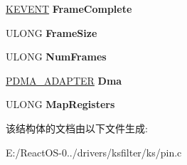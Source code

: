 \begin{DoxyCompactItemize}
\item 
\mbox{\label{struct_i_ks_pin_impl_ac589f8b5a203ed1f9e3703fd609e3782}} 
\hyperlink{struct___k_e_v_e_n_t}{K\+E\+V\+E\+NT} {\bfseries Frame\+Complete}
\item 
\mbox{\label{struct_i_ks_pin_impl_a5ede6905df58a6b254bfe28c06d3641c}} 
U\+L\+O\+NG {\bfseries Frame\+Size}
\item 
\mbox{\label{struct_i_ks_pin_impl_a0c4322e0972d47d3d9b164854a489a89}} 
U\+L\+O\+NG {\bfseries Num\+Frames}
\item 
\mbox{\label{struct_i_ks_pin_impl_aa8d24b67ebc23aea326ecc0eef456653}} 
\hyperlink{struct___d_m_a___a_d_a_p_t_e_r}{P\+D\+M\+A\+\_\+\+A\+D\+A\+P\+T\+ER} {\bfseries Dma}
\item 
\mbox{\label{struct_i_ks_pin_impl_a45d65baa6cb076d8a39e15be3f153b0a}} 
U\+L\+O\+NG {\bfseries Map\+Registers}
\end{DoxyCompactItemize}


该结构体的文档由以下文件生成\+:\begin{DoxyCompactItemize}
\item 
E\+:/\+React\+O\+S-\/0../drivers/ksfilter/ks/pin.\+c\end{DoxyCompactItemize}
